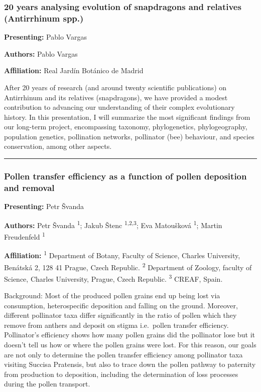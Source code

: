 \documentclass[
  letterpaper,
  DIV=11,
  numbers=noendperiod]{scrartcl}
\begin{document}
\subsubsection{20 years analysing evolution of snapdragons and relatives
(Antirrhinum
spp.)}\label{years-analysing-evolution-of-snapdragons-and-relatives-antirrhinum-spp.}

\textbf{Presenting:} Pablo Vargas

\textbf{Authors:} Pablo Vargas

\textbf{Affiliation:} Real Jardín Botánico de Madrid

After 20 years of research (and around twenty scientific publications)
on Antirrhinum and its relatives (snapdragons), we have provided a
modest contribution to advancing our understanding of their complex
evolutionary history. In this presentation, I will summarize the most
significant findings from our long-term project, encompassing taxonomy,
phylogenetics, phylogeography, population genetics, pollination
networks, pollinator (bee) behaviour, and species conservation, among
other aspects.

\begin{center}\rule{0.5\linewidth}{0.5pt}\end{center}

\subsubsection{Pollen transfer efficiency as a function of pollen
deposition and
removal}\label{pollen-transfer-efficiency-as-a-function-of-pollen-deposition-and-removal}

\textbf{Presenting:} Petr Švanda

\textbf{Authors:} Petr Švanda \textsuperscript{1}; Jakub Štenc
\textsuperscript{1,2,3}; Eva Matoušková \textsuperscript{1}; Martin
Freudenfeld \textsuperscript{1}

\textbf{Affiliation:} \textsuperscript{1} Department of Botany, Faculty
of Science, Charles University, Benátská 2, 128 41 Prague, Czech
Republic. \textsuperscript{2} Department of Zoology, faculty of Science,
Charles University, Prague, Czech Republic. \textsuperscript{3} CREAF,
Spain.

Background: Most of the produced pollen grains end up being lost via
consumption, heterospecific deposition and falling on the ground.
Moreover, different pollinator taxa differ significantly in the ratio of
pollen which they remove from anthers and deposit on stigma i.e.~pollen
transfer efficiency. Pollinator's efficiency shows how many pollen
grains did the pollinator lose but it doesn't tell us how or where the
pollen grains were lost. For this reason, our goals are not only to
determine the pollen transfer efficiency among pollinator taxa visiting
Succisa Pratensis, but also to trace down the pollen pathway to
paternity from production to deposition, including the determination of
loss processes during the pollen transport.
\end{document}
